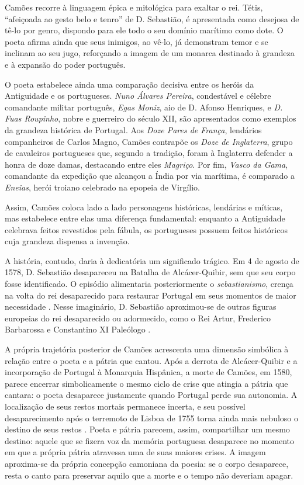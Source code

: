 Camões recorre à linguagem épica e mitológica para exaltar o rei. Tétis,
``afeiçoada ao gesto belo e tenro'' de D. Sebastião, é apresentada como
desejosa de tê-lo por genro, dispondo para ele todo o seu domínio marítimo como
dote. O poeta afirma ainda que seus inimigos, ao vê-lo, já demonstram temor e
se inclinam ao seu jugo, reforçando a imagem de um monarca destinado à grandeza
e à expansão do poder português.

O poeta estabelece ainda uma comparação decisiva entre os heróis da Antiguidade
e os portugueses. \textit{Nuno Álvares Pereira}, condestável e célebre
comandante militar português, \textit{Egas Moniz}, aio de D. Afonso Henriques,
e \textit{D. Fuas Roupinho}, nobre e guerreiro do século XII, são apresentados
como exemplos da grandeza histórica de Portugal. Aos \textit{Doze Pares de
França}, lendários companheiros de Carlos Magno, Camões contrapõe os
\textit{Doze de Inglaterra}, grupo de cavaleiros portugueses que, segundo a
tradição, foram à Inglaterra defender a honra de doze damas, destacando entre
eles \textit{Magriço}. Por fim, \textit{Vasco da Gama}, comandante da expedição
que alcançou a Índia por via marítima, é comparado a \textit{Eneias}, herói
troiano celebrado na epopeia de Virgílio.

Assim, Camões coloca lado a lado personagens históricas, lendárias e míticas,
mas estabelece entre elas uma diferença fundamental: enquanto a Antiguidade
celebrava feitos revestidos pela fábula, os portugueses possuem feitos
históricos cuja grandeza dispensa a invenção.

A história, contudo, daria à dedicatória um significado trágico. Em 4 de agosto
de 1578, D. Sebastião desapareceu na Batalha de Alcácer-Quibir, sem que seu
corpo fosse identificado. O episódio alimentaria posteriormente o
\textit{sebastianismo}, crença na volta do rei desaparecido para restaurar
Portugal em seus momentos de maior necessidade
\cite{profetismo_espiritualidade_camoes_pascoaes}. Nesse imaginário, D.
Sebastião aproximou-se de outras figuras europeias do rei desaparecido ou
adormecido, como o Rei Artur, Frederico Barbarossa e Constantino XI Paleólogo
\cite{zierer_rei_artur_sebastiao}.

A própria trajetória posterior de Camões acrescenta uma dimensão simbólica à
relação entre o poeta e a pátria que cantou. Após a derrota de Alcácer-Quibir e
a incorporação de Portugal à Monarquia Hispânica, a morte de Camões, em 1580,
parece encerrar simbolicamente o mesmo ciclo de crise que atingia a pátria que
cantara: o poeta desaparece justamente quando Portugal perde sua autonomia. A
localização de seus restos mortais permanece incerta, e seu possível
desaparecimento após o terremoto de Lisboa de 1755 torna ainda mais nebuloso o
destino de seus restos \cite{garrett_camoes}. Poeta e pátria parecem, assim,
compartilhar um mesmo destino: aquele que se fizera voz da memória portuguesa
desaparece no momento em que a própria pátria atravessa uma de suas maiores
crises. A imagem aproxima-se da própria concepção camoniana da poesia: se o
corpo desaparece, resta o canto para preservar aquilo que a morte e o tempo não
deveriam apagar.
